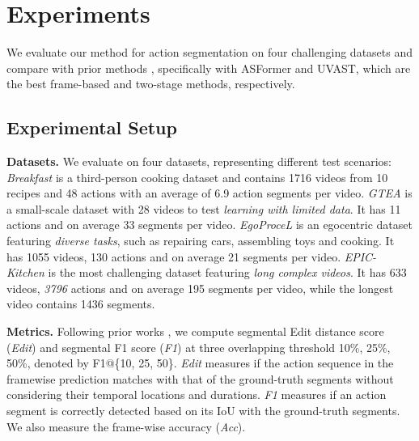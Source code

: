 \documentclass[10pt,twocolumn,letterpaper]{article}
\newcommand{\headline}[1]{\noindent \textbf{#1}}
\newcommand{\0}{\boldsymbol{0}}
\begin{document}
\section{Experiments}
We evaluate our method for action segmentation on four challenging datasets and compare with prior methods \cite{Farha:CVPR19,Li:TPAMI20,Ishikawa:WACV21,Yi:BMVC21,Behrmann:ECCV22}, specifically with ASFormer\cite{Yi:BMVC21} and UVAST\cite{Behrmann:ECCV22}, which are the best frame-based and two-stage methods, respectively.


\subsection{Experimental Setup}
\headline{Datasets.} We evaluate on four datasets, representing different test scenarios: 
\textit{Breakfast} \cite{Serre:CVPR14} is a third-person cooking dataset and contains 1716 videos from 10 recipes and 48 actions with an average of 6.9 action segments per video.
\textit{GTEA} \cite{Fathi:CVPR21} is a small-scale dataset with 28 videos to test \textit{learning with limited data}. It has 11 actions and on average 33 segments per video.
\textit{EgoProceL} \cite{Bansal:ECCV2022} is an egocentric dataset featuring \textit{diverse tasks}, such as repairing cars, assembling toys and cooking. 
It has 1055 videos, 130 actions and on average 21 segments per video.
\textit{EPIC-Kitchen} \cite{Damen:IJCV22} is the most challenging dataset featuring \textit{long complex videos}. It has 633 videos, \textit{3796} actions and on average 195 segments per video, while the longest video contains 1436 segments. 

\headline{Metrics.}
Following prior works \cite{Farha:CVPR19,Li:TPAMI20,Yi:BMVC21,Dipika:Arxiv21,Behrmann:ECCV22}, we compute segmental Edit distance score (\textit{Edit}) and segmental F1 score (\textit{F1}) at three overlapping threshold 10\%, 25\%, 50\%, denoted by F1@\{10, 25, 50\}. 
\textit{Edit} measures if the action sequence in the framewise prediction matches with that of the ground-truth segments without considering their temporal locations and durations. 
\textit{F1} measures if an action segment is correctly detected based on its IoU with the ground-truth segments. 
We also measure the frame-wise accuracy (\textit{Acc}).
\end{document}
